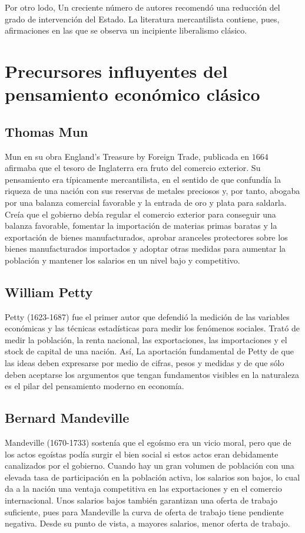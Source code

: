 \documentclass[10pt]{book}
\begin{document}
Por otro lodo, Un creciente número de autores recomendó una reducción del grado de intervención del Estado. La literatura mercantilista contiene, pues, afirmaciones en las que se observa un incipiente liberalismo clásico.

\section{Precursores influyentes del pensamiento económico clásico}
\subsection{Thomas Mun}
Mun en su obra England's Treasure by Foreign Trade, publicada en $1664$ afirmaba que el tesoro de Inglaterra era fruto del comercio exterior. Su pensamiento era típicamente mercantilista, en el sentido de que confundía la riqueza de una nación con sus reservas de metales preciosos y, por tanto, abogaba por una balanza comercial favorable y la entrada de oro y plata para saldarla. Creía que el gobierno debía regular el comercio exterior para conseguir una balanza favorable, fomentar la importación de materias primas baratas y la exportación de bienes manufacturados, aprobar aranceles protectores sobre los bienes manufacturados importados y adoptar otras medidas para aumentar la población y mantener los salarios en un nivel bajo y competitivo.

\subsection{William Petty}
Petty (1623-1687) fue el primer autor que defendió la medición de las variables económicas y las técnicas estadísticas para medir los fenómenos sociales. Trató de medir la población, la renta nacional, las exportaciones, las importaciones y el stock de capital de una nación. Así, La aportación fundamental de Petty de que las ideas deben expresarse por medio de cifras, pesos y medidas y de que sólo deben aceptarse los argumentos que tengan fundamentos visibles en la naturaleza es el pilar del pensamiento moderno en economía.

\subsection{Bernard Mandeville}
Mandeville (1670-1733) sostenía que el egoísmo era un vicio moral, pero que de los actos egoístas podía surgir el bien social si estos actos eran debidamente canalizados por el gobierno. Cuando hay un gran volumen de población con una elevada tasa de participación en la población activa, los salarios son bajos, lo cual da a la nación una ventaja competitiva en las exportaciones y en el comercio internacional. Unos salarios bajos también garantizan una oferta de trabajo suficiente, pues para Mandeville la curva de oferta de trabajo tiene pendiente negativa. Desde su punto de vista, a mayores salarios, menor oferta de trabajo.
\end{document}
